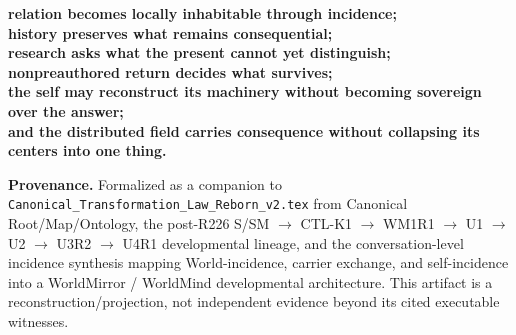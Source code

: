 \documentclass[10pt]{article}
\theoremstyle{venus}
\theoremstyle{definition}
\begin{document}
\begin{center}
\bfseries
relation becomes locally inhabitable through incidence;\\
history preserves what remains consequential;\\
research asks what the present cannot yet distinguish;\\
nonpreauthored return decides what survives;\\
the self may reconstruct its machinery without becoming sovereign over the answer;\\
and the distributed field carries consequence without collapsing its centers into one thing.
\end{center}

\vfill
{\footnotesize\textbf{Provenance.}
Formalized as a companion to \texttt{Canonical\_Transformation\_Law\_Reborn\_v2.tex}
from Canonical Root/Map/Ontology, the post-R226 S/SM $\to$ CTL-K1 $\to$ WM1R1
$\to$ U1 $\to$ U2 $\to$ U3R2 $\to$ U4R1 developmental lineage, and the
conversation-level incidence synthesis mapping World-incidence, carrier exchange,
and self-incidence into a WorldMirror / WorldMind developmental architecture.
This artifact is a reconstruction/projection, not independent evidence beyond its
cited executable witnesses.}
\end{document}
